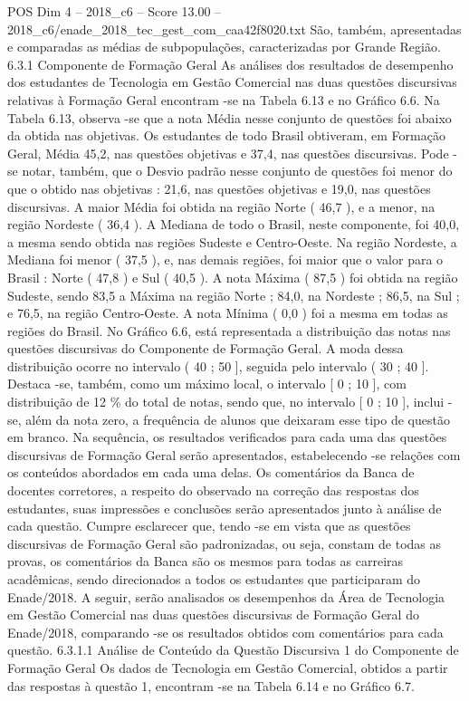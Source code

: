 \begin{textsample}{POS Dim 4 – 2018\_c6 – Score 13.00 – 2018\_c6/enade\_2018\_tec\_gest\_com\_caa42f8020.txt}
São, também, apresentadas e comparadas as médias de subpopulações, caracterizadas por Grande Região. 6.3.1 Componente de Formação Geral As análises dos resultados de desempenho dos estudantes de Tecnologia em Gestão Comercial nas duas questões discursivas relativas à Formação Geral encontram -se na Tabela 6.13 e no Gráfico 6.6.
Na Tabela 6.13, observa -se que a nota Média nesse conjunto de questões foi abaixo da obtida nas objetivas.
Os estudantes de todo Brasil obtiveram, em Formação Geral, Média 45,2, nas questões objetivas e 37,4, nas questões discursivas.
Pode -se notar, também, que o Desvio padrão nesse conjunto de questões foi menor do que o obtido nas objetivas : 21,6, nas questões objetivas e 19,0, nas questões discursivas.
A maior Média foi obtida na região Norte ( 46,7 ), e a menor, na região Nordeste ( 36,4 ).
A Mediana de todo o Brasil, neste componente, foi 40,0, a mesma sendo obtida nas regiões Sudeste e Centro-Oeste.
Na região Nordeste, a Mediana foi menor ( 37,5 ), e, nas demais regiões, foi maior que o valor para o Brasil : Norte ( 47,8 ) e Sul ( 40,5 ).
A nota Máxima ( 87,5 ) foi obtida na região Sudeste, sendo 83,5 a Máxima na região Norte ; 84,0, na Nordeste ; 86,5, na Sul ; e 76,5, na região Centro-Oeste.
A nota Mínima ( 0,0 ) foi a mesma em todas as regiões do Brasil.
No Gráfico 6.6, está representada a distribuição das notas nas questões discursivas do Componente de Formação Geral.
A moda dessa distribuição ocorre no intervalo ( 40 ; 50 ], seguida pelo intervalo ( 30 ; 40 ].
Destaca -se, também, como um máximo local, o intervalo [ 0 ; 10 ], com distribuição de 12 \% do total de notas, sendo que, no intervalo [ 0 ; 10 ], inclui -se, além da nota zero, a frequência de alunos que deixaram esse tipo de questão em branco.
Na sequência, os resultados verificados para cada uma das questões discursivas de Formação Geral serão apresentados, estabelecendo -se relações com os conteúdos abordados em cada uma delas.
Os comentários da Banca de docentes corretores, a respeito do observado na correção das respostas dos estudantes, suas impressões e conclusões serão apresentados junto à análise de cada questão.
Cumpre esclarecer que, tendo -se em vista que as questões discursivas de Formação Geral são padronizadas, ou seja, constam de todas as provas, os comentários da Banca são os mesmos para todas as carreiras acadêmicas, sendo direcionados a todos os estudantes que participaram do Enade/2018.
A seguir, serão analisados os desempenhos da Área de Tecnologia em Gestão Comercial nas duas questões discursivas de Formação Geral do Enade/2018, comparando -se os resultados obtidos com comentários para cada questão. 6.3.1.1 Análise de Conteúdo da Questão Discursiva 1 do Componente de Formação Geral Os dados de Tecnologia em Gestão Comercial, obtidos a partir das respostas à questão 1, encontram -se na Tabela 6.14 e no Gráfico 6.7.

\end{textsample}
